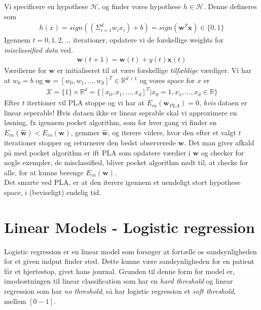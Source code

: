 \documentclass[paper=a4, fontsize=11pt]{scrartcl} %
\numberwithin{equation}{section} %
\numberwithin{figure}{section} %
\numberwithin{table}{section} %
\begin{document}
	Vi specificere en hypothese $\mathcal{H}$, og finder vores hypothese $h\in\mathcal{H}$. Denne defineres som
	\begin{align*}
	h(x)=sign\left(\left(\Sigma_{i=1}^d w_ix_i\right)+b\right)=sign(\mathbf{w}^T\mathbf{x})\in\{0,1\}
	\end{align*}
	Igennem $t=0,1,2,...$ iterationer, opdatere vi de forskellige weights for \textit{misclassified data} ved.
	\begin{align*}
	\mathbf{w}(t+1)=\mathbf{w}(t)+y(t)\mathbf{x}(t)
	\end{align*}
	Værdierne for $\mathbf{w}$ er initialiseret til at være forskellige \textit{tilfældige} værdiger. Vi har at $w_0=b$ og $\mathbf{w}=[w_0,w_1,...,w_d]^T\in\mathbb{R}^{d+1}$ og vores space for $x$ er
	\begin{align*}
	\mathcal{X}=\{1\}\times\mathbb{R}^d=\{[x_0,x_1,...,x_d]^T|x_0=1,x_1,...,x_d\in\mathbb{R}\} 
	\end{align*} 
	Efter $t$ itertioner vil PLA stoppe og vi har at $E_{in}(\mathbf{w}_{PLA})=0$, \textit{hvis} dataen er linear seperable! Hvis dataen ikke er linear seprable skal vi approximere en løsning, fx igennem pocket algorithm, som for hver gang vi finder en$E_{in}(\hat{\mathbf{w}})<E_{in}(\mathbf{w})$, gemmer $\hat{\mathbf{w}}$, og iterere videre, hvor den efter et valgt $t$ iterationer stopper og returnerer den bedst observerede $\mathbf{w}$. Det man giver afkald på med pocket algorithm er ift PLA som opdatere værdier i $\mathbf{w}$ og checker for nogle exempler, de misclassified, bliver pocket algorithm nødt til, at checke for alle, for at kunne berenge $E_{in}(\mathbf{w})$. \\
	
	Det smarte ved PLA, er at den iterere igennem et uendeligt stort hypothese space, i (beviseligt) endelig tid. 
	
	\newpage
	
	\section*{Linear Models - Logistic regression}
	
	Logistic regression er en linear model som forsøger at fortælle os sandsynligheden for et given indput finder sted. Dette kunne være sandsynligheden for en patient får et hjertestop, givet hans journal. Grunden til denne form for model er, imodsætningen til linear classification som har en \textit{hard threshold} og linear regression som har \textit{no threshold}, så har logistic regression et \textit{soft threshold}, mellem $[0-1]$. \\
	
\end{document}
